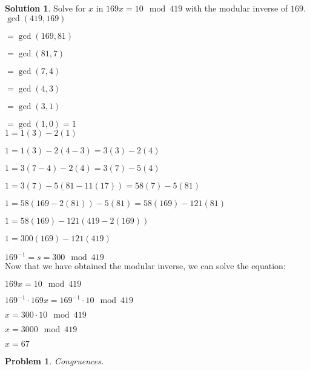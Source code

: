 \documentclass{article}
\newtheorem{problem}{Problem}
\theoremstyle{definition}
\newtheorem*{solution}{Solution}
\begin{document}
\begin{solution}

Solve for \(x\) in \(169x=10\mod 419\) with the modular inverse of \(169\). \\

\(\gcd (419,169)\)

\(=\gcd (169,81)\)

\(=\gcd (81,7)\)

\(=\gcd (7,4)\)

\(=\gcd (4,3)\)

\(=\gcd (3,1)\)

\(=\gcd (1,0)=1\) \\

\(1=1(3)-2(1)\)

\(1=1(3)-2(4-3)=3(3)-2(4)\)

\(1=3(7-4)-2(4)=3(7)-5(4)\)

\(1=3(7)-5(81-11(17))=58(7)-5(81)\)

\(1=58(169-2(81))-5(81)=58(169)-121(81)\)

\(1=58(169)-121(419-2(169))\)

\(1=300(169)-121(419)\)

\(169^{-1}=s=300\mod 419\) \\

Now that we have obtained the modular inverse, we can solve the equation:

\(169x=10\mod 419\)

\(169^{-1}\cdot 169x=169^{-1}\cdot 10\mod 419\)

\(x=300\cdot 10\mod 419\)

\(x=3000\mod 419\)

\(x=67\)

\end{solution}

\begin{problem}

Congruences.

\end{problem}
\end{document}
